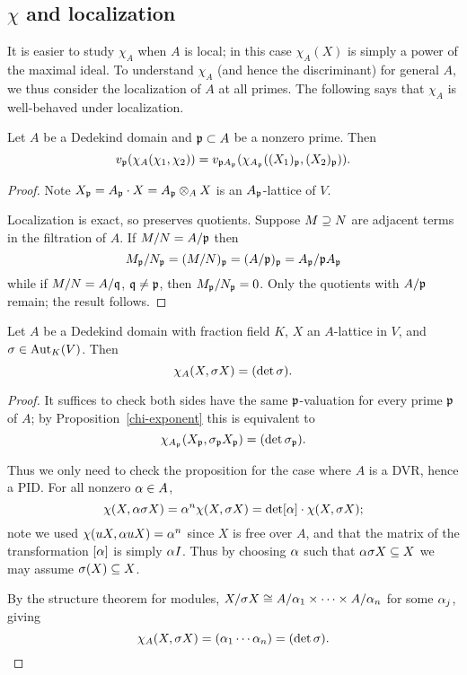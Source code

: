 \subsection{$\chi$ and localization}
It is easier to study $\chi_A$ when $A$ is local; in this case $\chi_A(X)$ is simply a power of the maximal ideal. To understand $\chi_A$ (and hence the discriminant) for general $A$, we thus consider the localization of $A$ at all primes. The following says that $\chi_A$ is well-behaved under localization.
\begin{pr}%
Let $A$ be a Dedekind domain and $\mathfrak{p}\subset A$ be a nonzero prime. Then %
\[
v_{\mathfrak{p}}(\chi_A(\chi_1,\chi_2))
=v_{\mathfrak{p} A_{\mathfrak{p}}}(\chi_{A_{\mathfrak{p}}}((X_{1})_{\mathfrak{p}},(X_2)_{\mathfrak{p}})).
\]
\end{pr}
\begin{proof}
Note $X_{\mathfrak{p}}=A_{\mathfrak{p}}\cdot X=A_{\mathfrak{p}}\otimes_A X$ is an $A_{\mathfrak{p}}$-lattice of $V$.

Localization is exact, so preserves quotients. Suppose $M\supseteq N$ are adjacent terms in the filtration of $A$. If $M/N=A/\mathfrak{p}$ then \[M_{\mathfrak{p}}/N_{\mathfrak{p}}=(M/N)_{\mathfrak{p}}=(A/\mathfrak{p})_{\mathfrak{p}} =A_{\mathfrak{p}}/\mathfrak{p} A_{\mathfrak{p}}\]
while if $M/N=A/\mathfrak{q}$, $\mathfrak{q}\ne\mathfrak{p}$, then $M_{\mathfrak{p}}/N_{\mathfrak{p}}=0$. Only the quotients with $A/\mathfrak{p}$ remain; the result follows.
\end{proof}
\begin{pr}
Let $A$ be a Dedekind domain with fraction field $K$, $X$ an $A$-lattice in $V$, and $\sigma\in \operatorname{Aut}_K(V)$. Then  
\[
\chi_A(X,\sigma X)=(\det\sigma).
\]
\end{pr}
\begin{proof}
It suffices to check both sides have the same $\mathfrak{p}$-valuation for every prime $\mathfrak{p}$ of $A$; by Proposition~\ref{chi-exponent} this is equivalent to
\[
\chi_{A_{\mathfrak{p}}}(X_{\mathfrak{p}},\sigma_{\mathfrak{p}} X_{\mathfrak{p}})=(\det\sigma_{\mathfrak{p}}).
\]

Thus we only need to check the proposition for the case where $A$ is a DVR, hence a PID. For all nonzero $\alpha\in A$, 
\[
\chi(X,\alpha \sigma X)=\alpha^n \chi(X,\sigma X)=\det[\alpha]\cdot\chi(X,\sigma X);
\]
note we used $\chi(uX,\alpha uX)=\alpha^n$ since $X$ is free over $A$, and that the matrix of the transformation $[\alpha]$ is simply $\alpha I$.
Thus by choosing $\alpha$ such that $\alpha \sigma X\subseteq X$ we may assume $\sigma(X)\subseteq X$.

By the structure theorem for modules, $X/\sigma X\cong A/\alpha_1\times \cdots \times A/\alpha_n$ for some $\alpha_j$, giving
\[
\chi_A(X,\sigma X)=(\alpha_1\cdots \alpha_n)=(\det \sigma).
\]
\end{proof}
